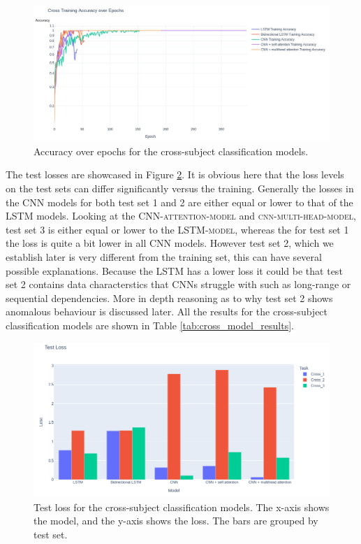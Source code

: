 \documentclass[conference]{IEEEtran}
\begin{document}
\begin{figure}[t]
    \centering
    \includegraphics[width=\textwidth]{figures/accuracy graph_over_epochs_small_new.jpg}
    \caption{Accuracy over epochs for the cross-subject classification models.}
    \label{fig:cross_accuracy_over_epoch}
\end{figure}

The test losses are showcased in Figure \ref{fig:test_loss_bars}. It is obvious here that the loss levels on the test sets can differ significantly versus the training. Generally the losses in the CNN models for both test set 1 and 2 are either equal or lower to that of the LSTM models. Looking at the \textsc{CNN-attention-model} and \textsc{cnn-multi-head-model}, test set 3 is either equal or lower to the \textsc{LSTM-model}, whereas the for test set 1 the loss is quite a bit lower in all CNN models. However test set 2, which we establish later is very different from the training set, this can have several possible explanations. Because the LSTM has a lower loss it could be that test set 2 contains data characterstics that CNNs struggle with such as long-range or sequential dependencies. More in depth reasoning as to why test set 2 shows anomalous behaviour is discussed later. All the results for the cross-subject classification models are shown in Table \ref{tab:cross_model_results}.

\begin{figure}[t]
    \centering
    \includegraphics[width=\textwidth]{figures/test_loss_bars.png}
    \caption{Test loss for the cross-subject classification models. The x-axis shows the model, and the y-axis shows the loss. The bars are grouped by test set.}
    \label{fig:test_loss_bars}
\end{figure}
\end{document}
